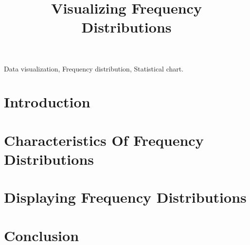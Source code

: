 \documentclass[conference]{IEEEtran}
\begin{document}
\title{Visualizing Frequency Distributions}

\author{
}

\maketitle

\begin{abstract}

\end{abstract}

\begin{IEEEkeywords}
Data visualization, Frequency distribution, Statistical chart.
\end{IEEEkeywords}

\section{Introduction}
 

\section{Characteristics Of Frequency Distributions}


\section{Displaying Frequency Distributions}
 

\section{Conclusion}
 

\nocite{*}

 
\end{document}
